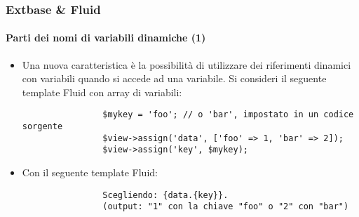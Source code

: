\begin{frame}[fragile]
	\frametitle{Extbase \& Fluid}
	\framesubtitle{Parti dei nomi di variabili dinamiche (1)}

	\lstset{basicstyle=\tiny\ttfamily}

	\begin{itemize}

		\item Una nuova caratteristica è la possibilità di utilizzare dei riferimenti 
			dinamici con variabili quando si accede ad una variabile.
			Si consideri il seguente template Fluid con array di variabili:

			\begin{lstlisting}
				$mykey = 'foo'; // o 'bar', impostato in un codice sorgente
				$view->assign('data', ['foo' => 1, 'bar' => 2]);
				$view->assign('key', $mykey);
			\end{lstlisting}

		\item Con il seguente template Fluid:

			\begin{lstlisting}
				Scegliendo: {data.{key}}.
				(output: "1" con la chiave "foo" o "2" con "bar")
			\end{lstlisting}

	\end{itemize}

\end{frame}


